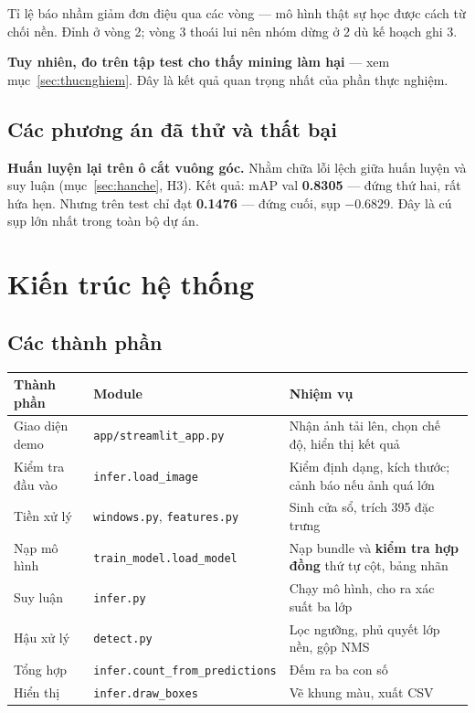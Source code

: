 \documentclass[12pt]{ai_conquer2026}
\begin{document}
Tỉ lệ báo nhầm giảm đơn điệu qua các vòng --- mô hình thật sự học được cách từ chối nền. Đỉnh ở vòng 2; vòng 3 thoái lui nên nhóm dừng ở 2 dù kế hoạch ghi 3.

\textbf{Tuy nhiên, đo trên tập test cho thấy mining làm hại} --- xem mục~\ref{sec:thucnghiem}. Đây là kết quả quan trọng nhất của phần thực nghiệm.

\subsection{Các phương án đã thử và thất bại}

\textbf{Huấn luyện lại trên ô cắt vuông góc.} Nhằm chữa lỗi lệch giữa huấn luyện và suy luận (mục~\ref{sec:hanche}, H3). Kết quả: mAP val \textbf{0.8305} --- đứng thứ hai, rất hứa hẹn. Nhưng trên test chỉ đạt \textbf{0.1476} --- đứng cuối, sụp $-0.6829$. Đây là cú sụp lớn nhất trong toàn bộ dự án.

\newpage
\section{Kiến trúc hệ thống}
\label{sec:kientruc}

\subsection{Các thành phần}

\begin{center}
\begin{tabular}{|l|l|p{7cm}|}
\hline
\textbf{Thành phần} & \textbf{Module} & \textbf{Nhiệm vụ} \\
\hline
Giao diện demo & \texttt{app/streamlit\_app.py} & Nhận ảnh tải lên, chọn chế độ, hiển thị kết quả \\
\hline
Kiểm tra đầu vào & \texttt{infer.load\_image} & Kiểm định dạng, kích thước; cảnh báo nếu ảnh quá lớn \\
\hline
Tiền xử lý & \texttt{windows.py}, \texttt{features.py} & Sinh cửa sổ, trích 395 đặc trưng \\
\hline
Nạp mô hình & \texttt{train\_model.load\_model} & Nạp bundle và \textbf{kiểm tra hợp đồng} thứ tự cột, bảng nhãn \\
\hline
Suy luận & \texttt{infer.py} & Chạy mô hình, cho ra xác suất ba lớp \\
\hline
Hậu xử lý & \texttt{detect.py} & Lọc ngưỡng, phủ quyết lớp nền, gộp NMS \\
\hline
Tổng hợp & \texttt{infer.count\_from\_predictions} & Đếm ra ba con số \\
\hline
Hiển thị & \texttt{infer.draw\_boxes} & Vẽ khung màu, xuất CSV \\
\hline
\end{tabular}
\end{center}
\end{document}
